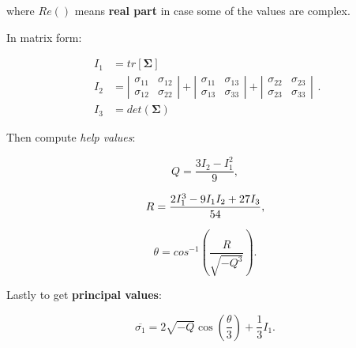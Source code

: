 \begin{itemize}
        where $ Re() $ means \textbf{real part} in case some of the values are complex.

        In matrix form:

        \begin{equation}
            \begin{array}{ll}
                I_{1} &= tr[\mathbf{\Sigma}] \\
                I_{2} &= \left| \begin{matrix}
                    \sigma_{11} & \sigma_{12} \\
                    \sigma_{12} & \sigma_{22}
                \end{matrix} \right| + \left| \begin{matrix}
                    \sigma_{11} & \sigma_{13} \\
                    \sigma_{13} & \sigma_{33}
                \end{matrix} \right| + \left| \begin{matrix}
                    \sigma_{22} & \sigma_{23} \\
                    \sigma_{23} & \sigma_{33}
                \end{matrix} \right| \\
                    I_{3} &= det(\mathbf{\Sigma})
            \end{array}
        .\end{equation}

        Then compute \textit{help values}:

        \begin{equation}
            Q = \frac{3 I_{2} - I_{1}^{2}}{9}
        ,\end{equation}

        \begin{equation}
            R = \frac{2 I_{1}^{3} - 9 I_{1} I_{2} + 27 I_{3}}{54} \\
        ,\end{equation}

        \begin{equation}
            \theta = cos^{-1} \left( \frac{ R }{ \sqrt{- Q^{3}}} \right)
        .\end{equation}

        Lastly to get \textbf{principal values}:

        \begin{equation}
            \overline{\sigma_{1}}
            = 2 \sqrt{-Q} \cos{\left(\frac{\theta}{3}\right)} + \frac{1}{3}I_{1}
        .\end{equation}


\end{itemize}
